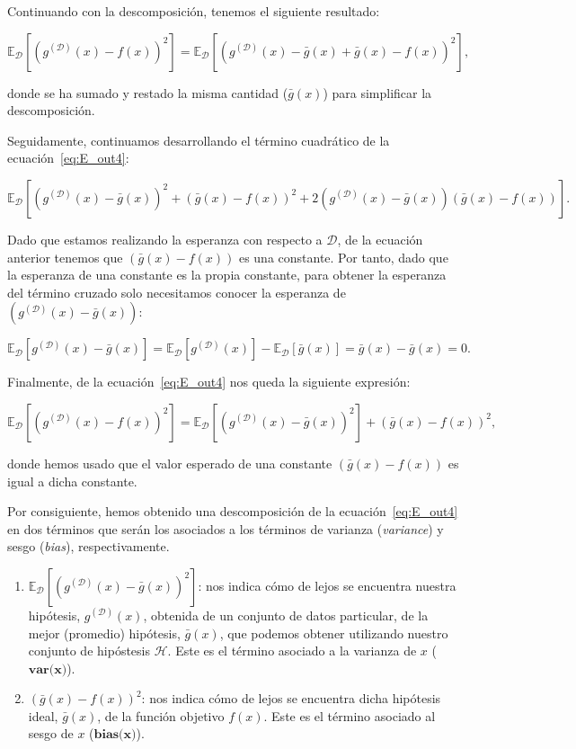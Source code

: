 Continuando con la descomposición, tenemos el siguiente resultado:

\begin{equation}\label{eq:E_out4}
    \mathbb{E}_{\mathcal{D}}[{(g^{\mathcal{(D)}}(x) - f(x))}^2] = \mathbb{E}_{\mathcal{D}}[{(g^{\mathcal{(D)}}(x) - \bar{g}(x) + \bar{g}(x) - f(x))}^2],
\end{equation}

donde se ha sumado y restado la misma cantidad ($\bar{g}(x)$) para simplificar la descomposición.

Seguidamente, continuamos desarrollando el término cuadrático de la ecuación~\eqref{eq:E_out4}:

\[ \mathbb{E}_{\mathcal{D}}[{(g^{\mathcal{(D)}}(x) - \bar{g}(x))}^2 + {(\bar{g}(x) - f(x))}^2 + 2(g^{\mathcal{(D)}}(x) - \bar{g}(x))(\bar{g}(x) - f(x))]. \]

Dado que estamos realizando la esperanza con respecto a $\mathcal{D}$, de la ecuación anterior tenemos que $(\bar{g}(x) - f(x))$ es una constante. Por tanto, dado que la esperanza de una constante es la propia constante, para obtener la esperanza del término cruzado solo necesitamos conocer la esperanza de $(g^{\mathcal{(D)}}(x) - \bar{g}(x))$:

\begin{equation}\label{eq:E_out6}
    \mathbb{E}_{\mathcal{D}}[g^{\mathcal{(D)}}(x) - \bar{g}(x)] = \mathbb{E}_{\mathcal{D}}[g^{\mathcal{(D)}}(x)] - \mathbb{E}_{\mathcal{D}}[\bar{g}(x)] = \bar{g}(x) - \bar{g}(x) = 0.
\end{equation}

Finalmente, de la ecuación~\eqref{eq:E_out4} nos queda la siguiente expresión:

\begin{equation}\label{eq:E_out7}
    \mathbb{E}_{\mathcal{D}}[{(g^{\mathcal{(D)}}(x) - f(x))}^2] = \mathbb{E}_{\mathcal{D}}[{(g^{\mathcal{(D)}}(x) - \bar{g}(x))}^2] + {(\bar{g}(x) - f(x))}^2,
\end{equation}

donde hemos usado que el valor esperado de una constante $(\bar{g}(x) - f(x))$ es igual a dicha constante.

Por consiguiente, hemos obtenido una descomposición de la ecuación~\eqref{eq:E_out4} en dos términos que serán los asociados a los términos de varianza (\textit{variance}) y sesgo (\textit{bias}), respectivamente.

\begin{enumerate}
    \item $\mathbb{E}_{\mathcal{D}}[{(g^{\mathcal{(D)}}(x) - \bar{g}(x))}^2]$: nos indica cómo de lejos se encuentra nuestra hipótesis, $g^{\mathcal{(D)}}(x)$, obtenida de un conjunto de datos particular, de la mejor (promedio) hipótesis, $\bar{g}(x)$, que podemos obtener utilizando nuestro conjunto de hipóstesis $\mathcal{H}$. Este es el término asociado a la varianza de $x$ ($\textbf{var(x)}$).
    \item ${(\bar{g}(x) - f(x))}^2$: nos indica cómo de lejos se encuentra dicha hipótesis ideal, $\bar{g}(x)$, de la función objetivo $f(x)$. Este es el término asociado al sesgo de $x$ ($\textbf{bias(x)}$).
\end{enumerate}

